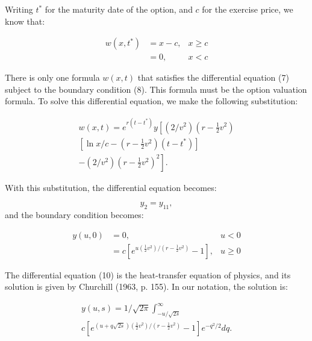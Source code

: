 \documentclass[a4paper, 12pt, twoside]{article}
\begin{document}
\vspace*{1mm}
\noindent Writing $t^*$ for the maturity date of the option, and $c$ for the exercise price, we know 
that:

\begin{equation}
\begin{array}{rll}
w(x,t^*) &=x-c, &x \ge c \\
         &=0,   &x < c
\end{array} 
\end{equation}

\vspace*{1mm}
\noindent There is only one formula $w(x,t)$ that satisfies the differential equation (7) subject 
to the boundary condition (8). This formula must be the option valuation formula.
To solve this differential equation, we make the following substitution:

\setlength{\jot}{5pt}
\begin{multline}
w(x,t)= e^{r(t-t^*)} y \left[ (2/v^2) \left( r-\frac{1}{2} v^2 \right) \right.\\
\left[\ln x/c - \left( r-\frac{1}{2}v^2 \right)(t-t^*) \right] \\
\left.-(2/v^2) \left(r-\frac{1}{2}v^2 \right)^2 \right].
\end{multline}

With this substitution, the differential equation becomes:

\begin{equation}
y_2=y_{11},
\end{equation}
and the boundary condition becomes:

\begin{equation}
\begin{array}{rll}
y(u,0) &=0, & u < 0 \\
       &=c \left[e^{u\left( \frac{1}{2} v^2\right)\big/ \left(r- \frac{1}{2} v^2\right)}-1 \right], & u \ge 0
\end{array} 
\end{equation}

The differential equation (10) is the heat-transfer equation of physics, and its 
solution is given by Churchill (1963, p. 155). In our notation, the solution is:

\begin{multline}
y(u,s)=1/\sqrt{2\pi} \int_{-u/\sqrt{2s}}^{\infty}\\
c\left[ e^{(u+q\sqrt{2s})\left( \frac{1}{2} v^2\right)\big/ \left(r- \frac{1}{2} v^2\right)}-1 \right]e^{-q^2/2}dq.
\end{multline}
\end{document}
